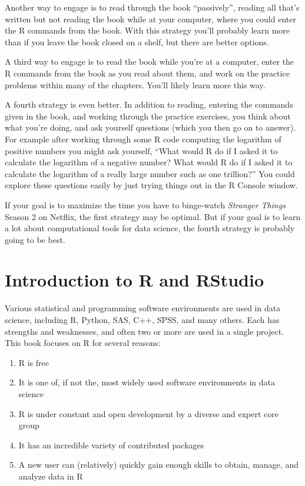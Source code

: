 \documentclass[
]{krantz}
\providecommand{\tightlist}{%
  \setlength{\itemsep}{0pt}\setlength{\parskip}{0pt}}
\begin{document}
Another way to engage is to read through the book ``passively'', reading all that's written but not reading the book while at your computer, where you could enter the R commands from the book. With this strategy you'll probably learn more than if you leave the book closed on a shelf, but there are better options.

A third way to engage is to read the book while you're at a computer, enter the R commands from the book as you read about them, and work on the practice problems within many of the chapters. You'll likely learn more this way.

A fourth strategy is even better. In addition to reading, entering the commands given in the book, and working through the practice exercises, you think about what you're doing, and ask yourself questions (which you then go on to answer). For example after working through some R code computing the logarithm of positive numbers you might ask yourself, ``What would R do if I asked it to calculate the logarithm of a negative number? What would R do if I asked it to calculate the logarithm of a really large number such as one trillion?'' You could explore these questions easily by just trying things out in the R Console window.

If your goal is to maximize the time you have to binge-watch \emph{Stranger Things} Season 2 on Netflix, the first strategy may be optimal. But if your goal is to learn a lot about computational tools for data science, the fourth strategy is probably going to be best.

\hypertarget{introduction-to-r-and-rstudio}{%
\chapter{Introduction to R and RStudio}\label{introduction-to-r-and-rstudio}}

Various statistical and programming software environments are used in data science, including R, Python, SAS, C++, SPSS, and many others. Each has strengths and weaknesses, and often two or more are used in a single project. This book focuses on R for several reasons:

\begin{enumerate}
\def\labelenumi{\arabic{enumi}.}
\tightlist
\item
  R is free
\item
  It is one of, if not the, most widely used software environments in data science
\item
  R is under constant and open development by a diverse and expert core group
\item
  It has an incredible variety of contributed packages
\item
  A new user can (relatively) quickly gain enough skills to obtain, manage, and analyze data in R
\end{enumerate}
\end{document}
